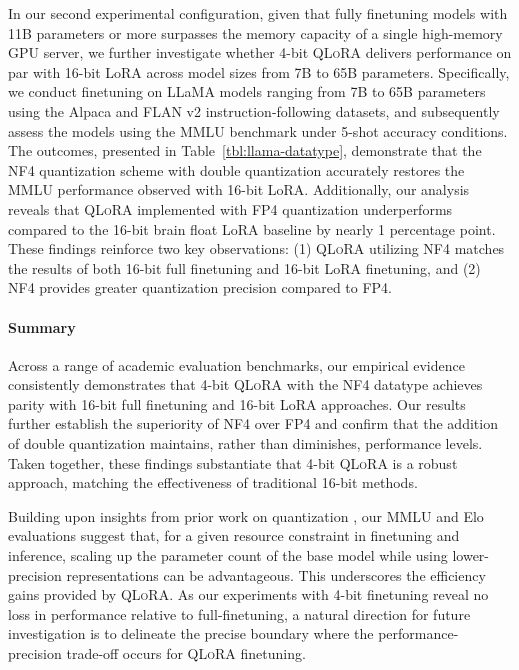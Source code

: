 In our second experimental configuration, given that fully finetuning models with 11B parameters or more surpasses the memory capacity of a single high-memory GPU server, we further investigate whether 4-bit \textsc{QLoRA} delivers performance on par with 16-bit LoRA across model sizes from 7B to 65B parameters. Specifically, we conduct finetuning on LLaMA models ranging from 7B to 65B parameters using the Alpaca and FLAN v2 instruction-following datasets, and subsequently assess the models using the MMLU benchmark under 5-shot accuracy conditions. The outcomes, presented in Table~\ref{tbl:llama-datatype}, demonstrate that the NF4 quantization scheme with double quantization accurately restores the MMLU performance observed with 16-bit LoRA. Additionally, our analysis reveals that \textsc{QLoRA} implemented with FP4 quantization underperforms compared to the 16-bit brain float LoRA baseline by nearly 1 percentage point. These findings reinforce two key observations: (1) \textsc{QLoRA} utilizing NF4 matches the results of both 16-bit full finetuning and 16-bit LoRA finetuning, and (2) NF4 provides greater quantization precision compared to FP4.

\paragraph{Summary} Across a range of academic evaluation benchmarks, our empirical evidence consistently demonstrates that 4-bit \textsc{QLoRA} with the NF4 datatype achieves parity with 16-bit full finetuning and 16-bit LoRA approaches. Our results further establish the superiority of NF4 over FP4 and confirm that the addition of double quantization maintains, rather than diminishes, performance levels. Taken together, these findings substantiate that 4-bit \textsc{QLoRA} is a robust approach, matching the effectiveness of traditional 16-bit methods.

Building upon insights from prior work on quantization \citep{dettmers2022case}, our MMLU and Elo evaluations suggest that, for a given resource constraint in finetuning and inference, scaling up the parameter count of the base model while using lower-precision representations can be advantageous. This underscores the efficiency gains provided by \textsc{QLoRA}. As our experiments with 4-bit finetuning reveal no loss in performance relative to full-finetuning, a natural direction for future investigation is to delineate the precise boundary where the performance-precision trade-off occurs for \textsc{QLoRA} finetuning.

